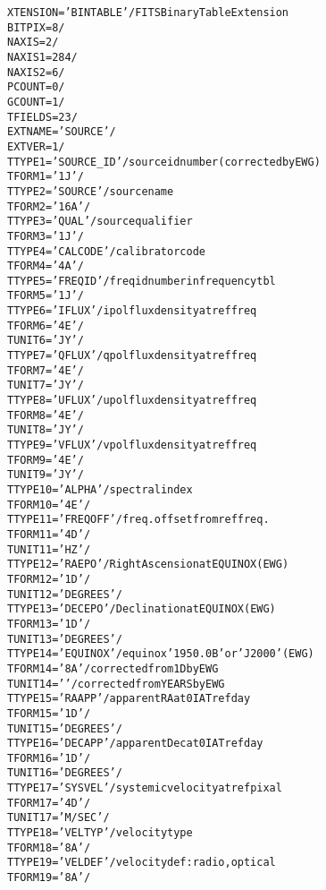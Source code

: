 \documentclass[twoside]{article}
\newcommand{\Ex}[1]{\textcolor{excol}{#1}}
\begin{document}
\begin{alltt}
XTENSION= 'BINTABLE'           / FITS Binary Table Extension
BITPIX  =                    8 /
NAXIS   =                    2 /
NAXIS1  =                  284 /
NAXIS2  =                    6 /
PCOUNT  =                    0 /
GCOUNT  =                    1 /
TFIELDS =                   23 /
EXTNAME = 'SOURCE  '           /
EXTVER  =                    1 /
\Ex{TTYPE1  = 'SOURCE_ID'          / source id number (corrected by EWG)}
TFORM1  = '1J      '           /
TTYPE2  = 'SOURCE  '           / source name
TFORM2  = '16A     '           /
TTYPE3  = 'QUAL    '           / source qualifier
TFORM3  = '1J      '           /
TTYPE4  = 'CALCODE '           / calibrator code
TFORM4  = '4A      '           /
TTYPE5  = 'FREQID  '           / freq id number in frequency tbl
TFORM5  = '1J      '           /
TTYPE6  = 'IFLUX   '           / ipol flux density at ref freq
TFORM6  = '4E      '           /
TUNIT6  = 'JY      '           /
TTYPE7  = 'QFLUX   '           / qpol flux density at ref freq
TFORM7  = '4E      '           /
TUNIT7  = 'JY      '           /
TTYPE8  = 'UFLUX   '           / upol flux density at ref freq
TFORM8  = '4E      '           /
TUNIT8  = 'JY      '           /
TTYPE9  = 'VFLUX   '           / vpol flux density at ref freq
TFORM9  = '4E      '           /
TUNIT9  = 'JY      '           /
TTYPE10 = 'ALPHA   '           / spectral index
TFORM10 = '4E      '           /
TTYPE11 = 'FREQOFF '           / freq. offset from ref freq.
TFORM11 = '4D      '           /
TUNIT11 = 'HZ      '           /
\Ex{TTYPE12 = 'RAEPO   '           / Right Ascension at EQUINOX (EWG)}
TFORM12 = '1D      '           /
TUNIT12 = 'DEGREES '           /
\Ex{TTYPE13 = 'DECEPO  '           / Declination at EQUINOX (EWG)}
TFORM13 = '1D      '           /
TUNIT13 = 'DEGREES '           /
\Ex{TTYPE14 = 'EQUINOX '           / equinox '1950.0B' or 'J2000' (EWG)}
\Ex{TFORM14 = '8A      '           / corrected from 1D by EWG}
\Ex{TUNIT14 = '        '           / corrected from YEARS by EWG}
TTYPE15 = 'RAAPP   '           / apparent RA at 0 IAT ref day
TFORM15 = '1D      '           /
TUNIT15 = 'DEGREES '           /
TTYPE16 = 'DECAPP  '           / apparent Dec at 0 IAT ref day
TFORM16 = '1D      '           /
TUNIT16 = 'DEGREES '           /
TTYPE17 = 'SYSVEL  '           / systemic velocity at ref pixal
TFORM17 = '4D      '           /
TUNIT17 = 'M/SEC   '           /
TTYPE18 = 'VELTYP  '           / velocity type
TFORM18 = '8A      '           /
TTYPE19 = 'VELDEF  '           / velocity def: radio, optical
TFORM19 = '8A      '           /

\end{alltt}
\end{document}
